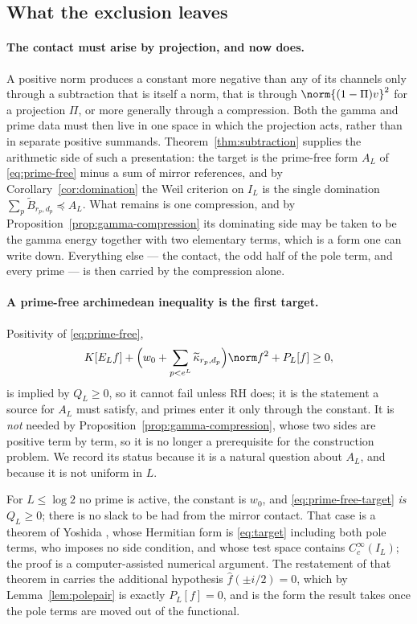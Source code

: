 \subsection{What the exclusion leaves}\label{subsec:leaves}
\paragraph{The contact must arise by projection, and now does.}
A positive norm produces a constant more negative than any of its channels
only through a subtraction that is itself a norm, that is through
$\norm{(1-\Pi)v}^2$ for a projection $\Pi$, or more generally through a
compression. Both the gamma and prime data must then live in one space in
which the projection acts, rather than in separate positive summands.
Theorem~\ref{thm:subtraction} supplies the arithmetic side of such a
presentation: the target is the prime-free form $A_L$ of
\eqref{eq:prime-free} minus a sum of mirror references, and by
Corollary~\ref{cor:domination} the Weil criterion on $I_L$ is the single
domination $\sum_p\widetilde B_{r_p,d_p}\preceq A_L$. What remains is one
compression, and by Proposition~\ref{prop:gamma-compression} its dominating
side may be taken to be the gamma energy together with two elementary terms,
which is a form one can write down. Everything else --- the contact, the odd
half of the pole term, and every prime --- is then carried by the compression
alone.

\paragraph{A prime-free archimedean inequality is the first target.}
Positivity of \eqref{eq:prime-free},
\begin{equation}\label{eq:prime-free-target}
 K[E_Lf]+\Big(w_0+\sum_{p<e^L}\widetilde\kappa_{r_p,d_p}\Big)\norm f^2
 +P_L[f]\geq0,
\end{equation}
is implied by $Q_L\geq0$, so it cannot fail unless RH does; it is the
statement a source for $A_L$ must satisfy, and primes enter it only through
the constant. It is \emph{not} needed by
Proposition~\ref{prop:gamma-compression}, whose two sides are positive term by
term, so it is no longer a prerequisite for the construction problem. We record
its status because it is a natural question about $A_L$, and because it is not
uniform in $L$.

For $L\leq\log2$ no prime is active, the constant is $w_0$, and
\eqref{eq:prime-free-target} \emph{is} $Q_L\geq0$; there is no slack to be had
from the mirror contact. That case is a theorem of Yoshida
\cite[Theorem 1]{Yoshida}, whose Hermitian form is \eqref{eq:target} including
both pole terms, who imposes no side condition, and whose test space contains
$C_c^\infty(I_L)$; the proof is a computer-assisted numerical argument. The
restatement of that theorem in \cite{CCWeil} carries the additional hypothesis
$\widehat f(\pm i/2)=0$, which by Lemma~\ref{lem:polepair} is exactly
$P_L[f]=0$, and is the form the result takes once the pole terms are moved out
of the functional.

